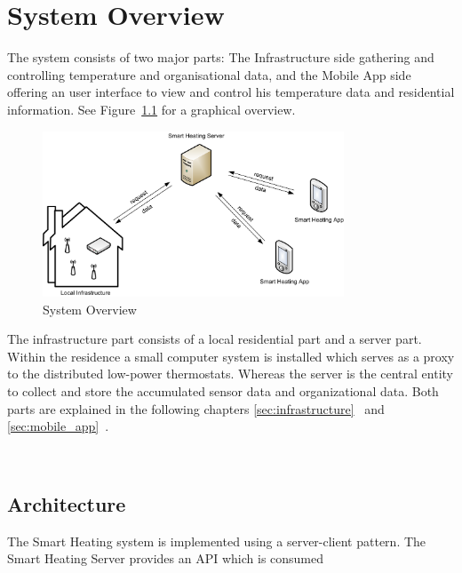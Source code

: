 
\chapter{System Overview}
\label{sec:system_overview}

The system consists of two major parts: The Infrastructure side gathering and controlling temperature and organisational data, and the Mobile App side offering an user interface to view and control his temperature data and residential information. See Figure~\ref{fig:systemoverview} for a graphical overview.

\begin{figure}[h]
\begin{center}
\includegraphics[width=0.8\textwidth]{images/SystemOverview.png}
\end{center}
\caption{System Overview}
\label{fig:systemoverview}
\end{figure}

The infrastructure part consists of a local residential part and a server part. Within the residence a small computer system is installed which serves as a proxy to the distributed low-power thermostats.
Whereas the server is the central entity to collect and store the accumulated sensor data and organizational data. Both parts are explained in the following chapters \ref{sec:infrastructure}~ and \ref{sec:mobile_app}~.

\\

\section{Architecture}

The Smart Heating system is implemented using a server-client pattern. The Smart Heating Server provides an API which is consumed 


